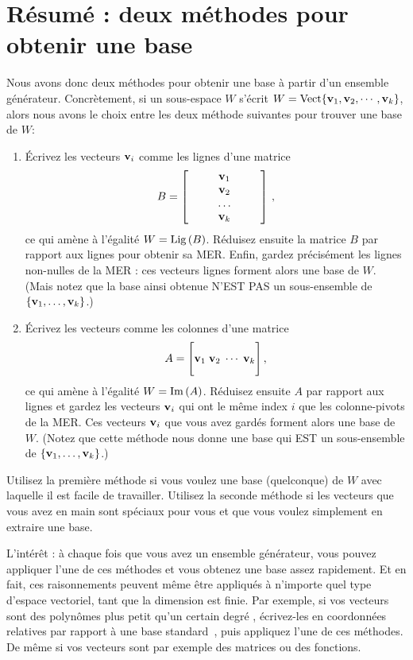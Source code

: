 \section{Résumé : deux méthodes pour obtenir une base}

Nous avons donc deux m\'ethodes pour obtenir une base à partir d'un ensemble g\'en\'erateur.
Concrètement, si un sous-espace $W$ s'écrit $W = \textrm{Vect}\{\mathbf{v}_1, \mathbf{v}_2, \cdots, \mathbf{v}_k\}$, alors nous avons le choix entre les deux méthode suivantes pour trouver une base de $W$:
\begin{enumerate}

\item Écrivez les vecteurs $\mathbf{v}_i$ comme les lignes d'une matrice 
$$B = \left[ \begin{matrix} ~&~&\mathbf{v}_1&~&~ \\ &&\mathbf{v}_2 \\ &&\ldots \\ &&\mathbf{v}_k  \end{matrix} \right]\,,$$
ce qui amène à l'égalité $W = \operatorname{Lig\,}(B)$.  Réduisez ensuite la matrice $B$ par rapport aux lignes pour obtenir sa MER. Enfin, gardez précisément les lignes non-nulles de la MER : ces vecteurs lignes forment alors une base de $W$. (Mais notez que la base ainsi obtenue N'EST PAS un sous-ensemble de $\{\mathbf{v}_1, \dots, \mathbf{v}_k\}$.)
\item Écrivez les vecteurs comme les colonnes d'une matrice 
$$A= \Bigg[\mathbf{v}_1 \; \mathbf{v}_2 \; \cdots \; \mathbf{v}_k\Bigg]\,,$$ 
ce qui amène à l'égalité $W = \operatorname{Im}\,(A)$.  Réduisez ensuite $A$ par rapport aux lignes et gardez les vecteurs $\mathbf{v}_i$ qui ont le même index $i$ que les colonne-pivots de la MER. Ces vecteurs $\mathbf{v}_i$ que vous avez gardés forment alors une base de $W$. (Notez que cette méthode nous donne une base qui EST un sous-ensemble de $\{\mathbf{v}_1, \dots, \mathbf{v}_k\}$.)


\end{enumerate}

Utilisez la première méthode si vous voulez une base (quelconque) de $W$ avec laquelle il est facile de travailler.
Utilisez la seconde méthode si les vecteurs que vous avez en main sont spéciaux pour vous et que vous voulez simplement en extraire une base.  

L'intérêt : à chaque fois que vous avez un ensemble g\'en\'erateur, vous pouvez appliquer l'une de ces
méthodes et vous obtenez une base assez rapidement.  Et en fait, ces raisonnements peuvent même être appliqués à n'importe quel type d'espace vectoriel, tant que la dimension est finie. Par exemple, si vos vecteurs sont des polynômes plus petit qu'un certain degré , écrivez-les en coordonnées relatives par rapport à une base \og standard\ \fg, puis appliquez l'une de ces méthodes. De même si vos vecteurs sont par exemple des matrices
ou des fonctions.\\

